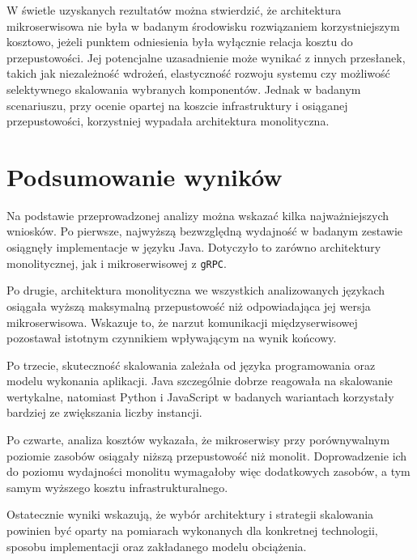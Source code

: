 W świetle uzyskanych rezultatów można stwierdzić, że architektura mikroserwisowa nie była w badanym środowisku rozwiązaniem korzystniejszym kosztowo, jeżeli punktem odniesienia była wyłącznie relacja kosztu do przepustowości. Jej potencjalne uzasadnienie może wynikać z innych przesłanek, takich jak niezależność wdrożeń, elastyczność rozwoju systemu czy możliwość selektywnego skalowania wybranych komponentów. Jednak w badanym scenariuszu, przy ocenie opartej na koszcie infrastruktury i osiąganej przepustowości, korzystniej wypadała architektura monolityczna.
\section{Podsumowanie wyników}

Na podstawie przeprowadzonej analizy można wskazać kilka najważniejszych wniosków. Po pierwsze, najwyższą bezwzględną wydajność w badanym zestawie osiągnęły implementacje w języku Java. Dotyczyło to zarówno architektury monolitycznej, jak i mikroserwisowej z \texttt{gRPC}.

Po drugie, architektura monolityczna we wszystkich analizowanych językach osiągała wyższą maksymalną przepustowość niż odpowiadająca jej wersja mikroserwisowa. Wskazuje to, że narzut komunikacji międzyserwisowej pozostawał istotnym czynnikiem wpływającym na wynik końcowy.

Po trzecie, skuteczność skalowania zależała od języka programowania oraz modelu wykonania aplikacji. Java szczególnie dobrze reagowała na skalowanie wertykalne, natomiast Python i JavaScript w badanych wariantach korzystały bardziej ze zwiększania liczby instancji.

Po czwarte, analiza kosztów wykazała, że mikroserwisy przy porównywalnym poziomie zasobów osiągały niższą przepustowość niż monolit. Doprowadzenie ich do poziomu wydajności monolitu wymagałoby więc dodatkowych zasobów, a tym samym wyższego kosztu infrastrukturalnego.

Ostatecznie wyniki wskazują, że wybór architektury i strategii skalowania powinien być oparty na pomiarach wykonanych dla konkretnej technologii, sposobu implementacji oraz zakładanego modelu obciążenia.